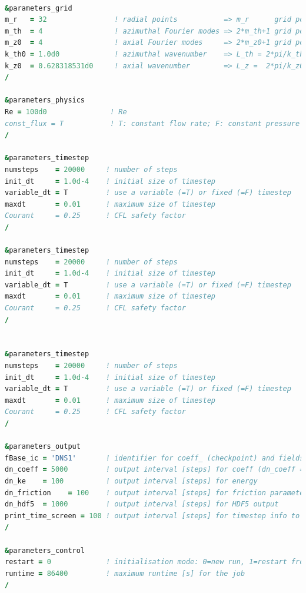 \documentclass[a4paper, 11pt, DIV=11]{scrartcl}
\begin{document}
\begin{lstlisting}[language=fortran]

&parameters_grid
m_r   = 32                ! radial points           => m_r      grid points (radial)
m_th  = 4                 ! azimuthal Fourier modes => 2*m_th+1 grid points (azimuthal)
m_z0  = 4                 ! axial Fourier modes     => 2*m_z0+1 grid points (axial)
k_th0 = 1.0d0             ! azimuthal wavenumber    => L_th = 2*pi/k_th0 azimuthal length of grid
k_z0  = 0.628318531d0     ! axial wavenumber        => L_z =  2*pi/k_z0  axial length of grid
/

&parameters_physics
Re = 100d0               ! Re
const_flux = T           ! T: constant flow rate; F: constant pressure gradient
/

&parameters_timestep
numsteps    = 20000     ! number of steps
init_dt     = 1.0d-4    ! initial size of timestep
variable_dt = T         ! use a variable (=T) or fixed (=F) timestep
maxdt       = 0.01      ! maximum size of timestep
Courant     = 0.25      ! CFL safety factor
/

&parameters_timestep
numsteps    = 20000     ! number of steps
init_dt     = 1.0d-4    ! initial size of timestep
variable_dt = T         ! use a variable (=T) or fixed (=F) timestep
maxdt       = 0.01      ! maximum size of timestep
Courant     = 0.25      ! CFL safety factor
/


&parameters_timestep
numsteps    = 20000     ! number of steps
init_dt     = 1.0d-4    ! initial size of timestep
variable_dt = T         ! use a variable (=T) or fixed (=F) timestep
maxdt       = 0.01      ! maximum size of timestep
Courant     = 0.25      ! CFL safety factor
/

&parameters_output
fBase_ic = 'DNS1'       ! identifier for coeff_ (checkpoint) and fields_ (hdf5) files
dn_coeff = 5000         ! output interval [steps] for coeff (dn_coeff = -1 disables ouput)
dn_ke    = 100          ! output interval [steps] for energy
dn_friction    = 100    ! output interval [steps] for friction parameters
dn_hdf5  = 1000         ! output interval [steps] for HDF5 output
print_time_screen = 100 ! output interval [steps] for timestep info to stdout
/

&parameters_control
restart = 0             ! initialisation mode: 0=new run, 1=restart from checkpoint (keep time), 2=restart from checkpoint (set time=0 and create new output files)
runtime = 86400         ! maximum runtime [s] for the job
/
\end{lstlisting}
\end{document}
